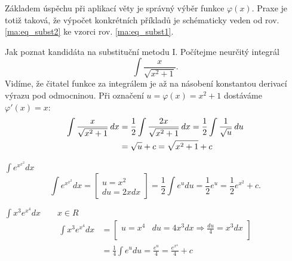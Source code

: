       Základem úspěchu při aplikací věty je správný výběr funkce $\varphi(x)$. Praxe je totiž
      taková, že výpočet konkrétních příkladů je schématicky veden od rov. \ref{ma:eq_subst2} ke
      vzorci rov. \ref{ma:eq_subst1}.
      
      \begin{example} Jak poznat kandidáta na substituční metodu I.\newline
        Počítejme neurčitý integrál \[\int \frac{x}{\sqrt{x^2+1}}.\]
        Vidíme, že čitatel funkce za integrálem je až na násobení konstantou derivací výrazu pod 
        odmocninou. Při označení \(u=\varphi(x) = x^2 + 1\) dostáváme \(\varphi'(x) = x\):
        \begin{align*}
          \int\frac{x}{\sqrt{x^2+1}}\hspace{2pt}dx 
            &= \frac{1}{2}\int\frac{2x}{\sqrt{x^2+1}}\hspace{2pt}dx 
             = \frac{1}{2}\int\frac{1}{\sqrt{u}}\hspace{2pt}du         \\
            &= \sqrt{u} + c = \sqrt{x^2 + 1} + c  
        \end{align*}
      \end{example}
      
      \begin{example}\label{ma:ex_sub_metoda}$\displaystyle\int{e^{x^{x^2}}dx}$
        \begin{equation*}
            \int{e^{x^{x^2}}dx}=
               \left[
                 \begin{array}{c}u=x^2 \\ du=2xdx\end{array}
               \right]=
               \frac{1}{2}\int{e^udu}=\frac{1}{2}e^u=\frac{1}{2}e^{x^2} + c.
        \end{equation*}
      \end{example}
      
      \begin{example}$\displaystyle\int{x^3e^{x^4}}dx \qquad x\in R$
        \begin{align*}
          \displaystyle\int{x^3e^{x^4}}dx
             &= 
             \left[
               \begin{array}{cc}
                  u=x^4   & du=4x^3dx \Rightarrow \displaystyle\frac{du}{4} = x^3dx  \\
               \end{array}
             \right]                                                                           \\
             &= \frac{1}{4}\int{e^u}du = \frac{e^u}{4} = \frac{e^{x^4}}{4} + c 
        \end{align*}
      \end{example}

